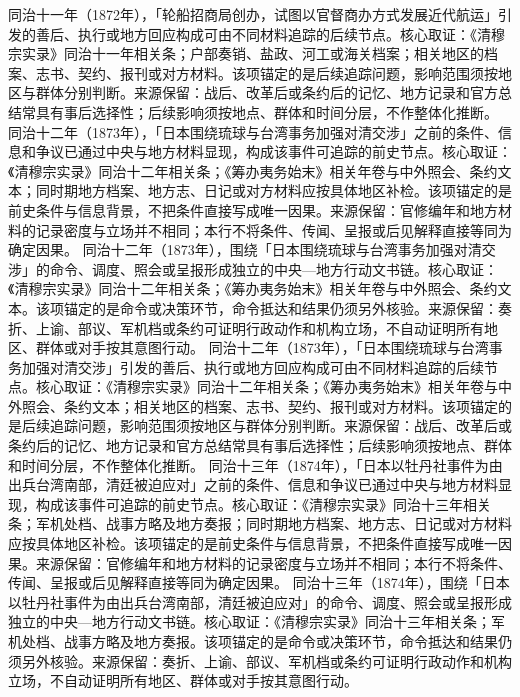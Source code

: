 同治十一年（1872年），「轮船招商局创办，试图以官督商办方式发展近代航运」引发的善后、执行或地方回应构成可由不同材料追踪的后续节点。核心取证：《清穆宗实录》同治十一年相关条；户部奏销、盐政、河工或海关档案；相关地区的档案、志书、契约、报刊或对方材料。该项锚定的是后续追踪问题，影响范围须按地区与群体分别判断。来源保留：战后、改革后或条约后的记忆、地方记录和官方总结常具有事后选择性；后续影响须按地点、群体和时间分层，不作整体化推断。
同治十二年（1873年），「日本围绕琉球与台湾事务加强对清交涉」之前的条件、信息和争议已通过中央与地方材料显现，构成该事件可追踪的前史节点。核心取证：《清穆宗实录》同治十二年相关条；《筹办夷务始末》相关年卷与中外照会、条约文本；同时期地方档案、地方志、日记或对方材料应按具体地区补检。该项锚定的是前史条件与信息背景，不把条件直接写成唯一因果。来源保留：官修编年和地方材料的记录密度与立场并不相同；本行不将条件、传闻、呈报或后见解释直接等同为确定因果。
同治十二年（1873年），围绕「日本围绕琉球与台湾事务加强对清交涉」的命令、调度、照会或呈报形成独立的中央—地方行动文书链。核心取证：《清穆宗实录》同治十二年相关条；《筹办夷务始末》相关年卷与中外照会、条约文本。该项锚定的是命令或决策环节，命令抵达和结果仍须另外核验。来源保留：奏折、上谕、部议、军机档或条约可证明行政动作和机构立场，不自动证明所有地区、群体或对手按其意图行动。
同治十二年（1873年），「日本围绕琉球与台湾事务加强对清交涉」引发的善后、执行或地方回应构成可由不同材料追踪的后续节点。核心取证：《清穆宗实录》同治十二年相关条；《筹办夷务始末》相关年卷与中外照会、条约文本；相关地区的档案、志书、契约、报刊或对方材料。该项锚定的是后续追踪问题，影响范围须按地区与群体分别判断。来源保留：战后、改革后或条约后的记忆、地方记录和官方总结常具有事后选择性；后续影响须按地点、群体和时间分层，不作整体化推断。
同治十三年（1874年），「日本以牡丹社事件为由出兵台湾南部，清廷被迫应对」之前的条件、信息和争议已通过中央与地方材料显现，构成该事件可追踪的前史节点。核心取证：《清穆宗实录》同治十三年相关条；军机处档、战事方略及地方奏报；同时期地方档案、地方志、日记或对方材料应按具体地区补检。该项锚定的是前史条件与信息背景，不把条件直接写成唯一因果。来源保留：官修编年和地方材料的记录密度与立场并不相同；本行不将条件、传闻、呈报或后见解释直接等同为确定因果。
同治十三年（1874年），围绕「日本以牡丹社事件为由出兵台湾南部，清廷被迫应对」的命令、调度、照会或呈报形成独立的中央—地方行动文书链。核心取证：《清穆宗实录》同治十三年相关条；军机处档、战事方略及地方奏报。该项锚定的是命令或决策环节，命令抵达和结果仍须另外核验。来源保留：奏折、上谕、部议、军机档或条约可证明行政动作和机构立场，不自动证明所有地区、群体或对手按其意图行动。
